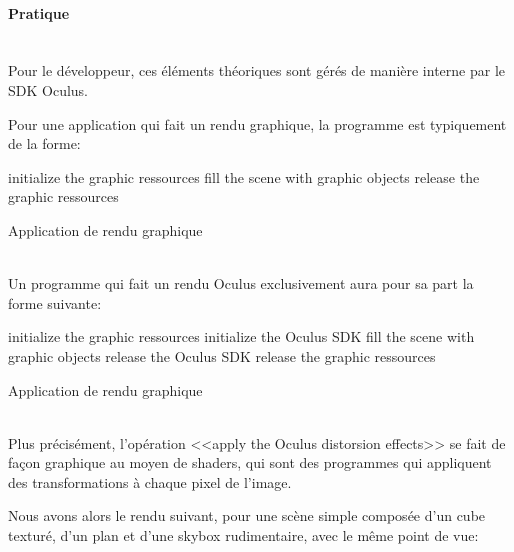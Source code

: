 \documentclass[a4paper,french,12pt]{article}
\begin{document}
			    \FloatBarrier
			\paragraph{Pratique} ~\\

			    Pour le développeur, ces éléments théoriques sont gérés de manière interne par le SDK Oculus.

			    Pour une application qui fait un rendu graphique, la programme est typiquement de
			    la forme:\\

			    \label{mainloop_normal}
			    \begin{algorithm}[H]
			      initialize the graphic ressources\;
			      fill the scene with graphic objects\;
			      release the graphic ressources\;
			      \caption{Application de rendu graphique}
			    \end{algorithm} ~\\

			    Un programme qui fait un rendu Oculus exclusivement aura pour sa part la forme suivante:\\
			    \label{mainloop_oculus}
			    \begin{algorithm}[H]
			      initialize the graphic ressources\;
			      initialize the Oculus SDK\;
			      fill the scene with graphic objects\;
			      release the Oculus SDK\;
			      release the graphic ressources\;
			      \caption{Application de rendu graphique}
			    \end{algorithm} ~\\
			    Plus précisément, l'opération <<apply the Oculus distorsion effects>> se fait de façon graphique
			    au moyen de shaders, qui sont des programmes qui appliquent des transformations à chaque pixel de l'image.


			    Nous avons alors le rendu suivant, pour une scène simple composée d'un cube texturé, d'un plan
			    et d'une skybox rudimentaire, avec le même point de vue:

			    \FloatBarrier
\end{document}
